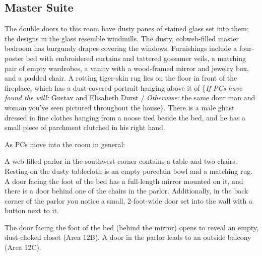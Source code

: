 \begin{arealinks}
\end{arealinks}


\pagebreak
\subsection{Master Suite}
\label{sec:MasterSuite}
\begin{readout}
  The double doors to this room have dusty panes of stained glass set into them; the designs in the glass
  resemble windmills. The dusty, cobweb-filled master bedroom has burgundy drapes covering the windows.
  Furnishings include a four-poster bed with embroidered curtains and tattered gossamer veils, a matching pair
  of empty wardrobes, a vanity with a wood-framed mirror and jewelry box, and a padded chair. A rotting
  tiger-skin rug lies on the floor in front of the fireplace, which has a dust-covered portrait hanging above it
  of \{\textit{If PCs have found the will:} Gustav and Elisabeth Durst / \textit{Otherwise:} the same dour
  man and woman you've seen pictured throughout the house\}. There is a male ghast dressed in fine clothes
  hanging from a noose tied beside the bed, and he has a small piece of parchment clutched in his right hand.
\end{readout}
As PCs move into the room in general:
\begin{readout}
  A web-filled parlor in the southwest corner contains a table and two chairs. Resting on the dusty tablecloth
  is an empty porcelain bowl and a matching rug. A door facing the foot of the bed has a full-length mirror
  mounted on it, and there is a door behind one of the chairs in the parlor. Additionally, in the back corner
  of the parlor you notice a small, 2-foot-wide door set into the wall with a button next to it.
\end{readout}
The door facing the foot of the bed (behind the mirror) opens to reveal an empty, dust-choked closet (Area 12B).
A door in the parlor leads to an outside balcony (Area 12C).

